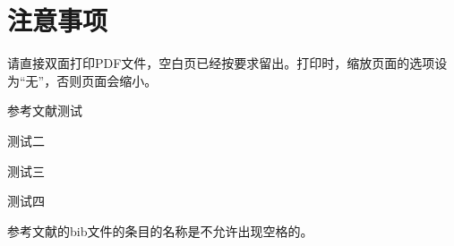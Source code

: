
\chapter{注意事项}
\label{chap03}

请直接双面打印PDF文件，空白页已经按要求留出。打印时，缩放页面的选项设
为“无”，否则页面会缩小。

参考文献测试\cite{BRINKSMEIER1994}

测试二\cite{tc2015,zxb2015,lbm2003,lbm2009}

测试三\cite{Klingenberg1990,Metropolis1953,Cook1990}

测试四\cite{Rabinow1948,Rokhlin1985,1985Rosensweig,Tani1984}



参考文献的bib文件的条目的名称是不允许出现空格的。